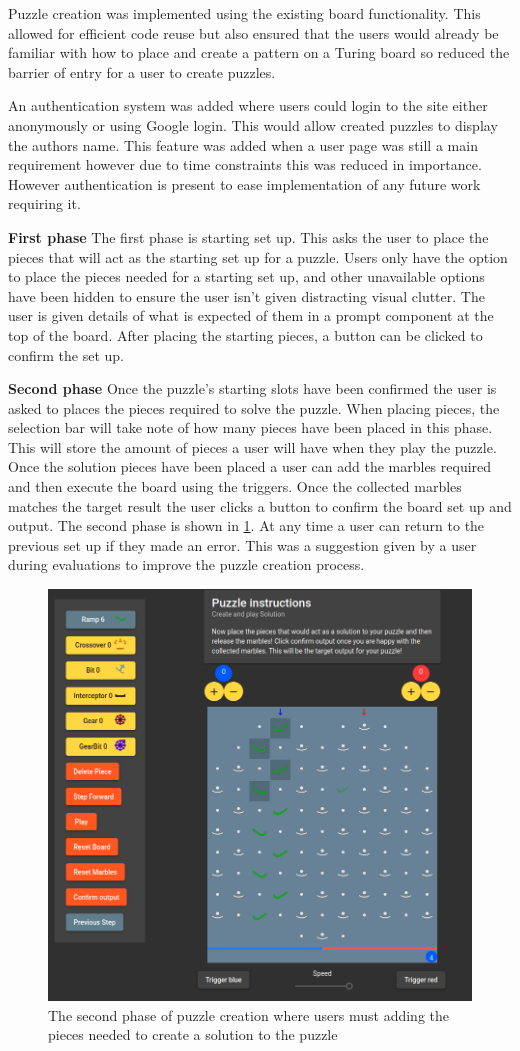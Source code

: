 \documentclass{l4proj}
\begin{document}
Puzzle creation was implemented using the existing board functionality. This allowed for efficient code reuse but also ensured that the users would already be familiar with how to place and create a pattern on a Turing board so reduced the barrier of entry for a user to create puzzles.

An authentication system was added where users could login to the site either anonymously or using Google login. This would allow created puzzles to display the authors name. This feature was added when a user page was still a main requirement however due to time constraints this was reduced in importance. However authentication is present to ease implementation of any future work requiring it.

\textbf{First phase}
The first phase is starting set up. This asks the user to place the pieces that will act as the starting set up for a puzzle. Users only have the option to place the pieces needed for a starting set up, and other unavailable options have been hidden to ensure the user isn't given distracting visual clutter. The user is given details of what is expected of them in a prompt component at the top of the board. After placing the starting pieces, a button can be clicked to confirm the set up. 

\textbf{Second phase}
Once the puzzle's starting slots have been confirmed the user is asked to places the pieces required to solve the puzzle. When placing pieces, the selection bar will take note of how many pieces have been placed in this phase. This will store the amount of pieces a user will have when they play the puzzle. Once the solution pieces have been placed a user can add the marbles required and then execute the board using the triggers. Once the collected marbles matches the target result the user clicks a button to confirm the board set up and output. The second phase is shown in \ref{fig:puzzleCreation}. At any time a user can return to the previous set up if they made an error. This was a suggestion given by a user during evaluations to improve the puzzle creation process.


\begin{figure}
    \centering
    \includegraphics[width=0.65\linewidth]{images/puzzleCreation.png}
    \caption{The second phase of puzzle creation where users must adding the pieces needed to create a solution to the puzzle}
    \label{fig:puzzleCreation}
\end{figure}
\end{document}
